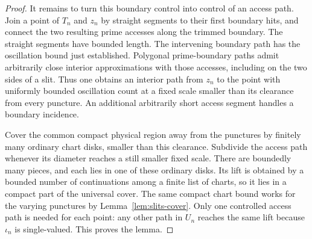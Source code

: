 \begin{proof}
It remains to turn this boundary control into control of an access
path.  Join a point of $T_n$ and $z_n$ by straight segments to their
first boundary hits, and connect the two resulting prime accesses
along the trimmed boundary.  The straight segments have bounded
length.  The intervening boundary path has the oscillation bound
just established.  Polygonal prime-boundary paths admit arbitrarily
close interior approximations with those accesses, including on
the two sides of a slit.  Thus one obtains an interior path from
$z_n$ to the point with uniformly bounded oscillation count at a
fixed scale smaller than its clearance from every puncture.  An
additional arbitrarily short access segment handles a boundary
incidence.

Cover the common compact physical region away from the punctures
by finitely many ordinary chart disks, smaller than this clearance.
Subdivide the access path whenever its diameter reaches a still
smaller fixed scale.  There are boundedly many pieces, and each
lies in one of these ordinary disks.  Its lift is obtained by a
bounded number of continuations among a finite list of charts,
so it lies in a compact part of the universal cover.  The same
compact chart bound works for the varying punctures by
Lemma~\ref{lem:slits-cover}.  Only one controlled access path is
needed for each point: any other path in $U_n$ reaches the same
lift because $\iota_n$ is single-valued.  This proves the lemma.
\end{proof}

